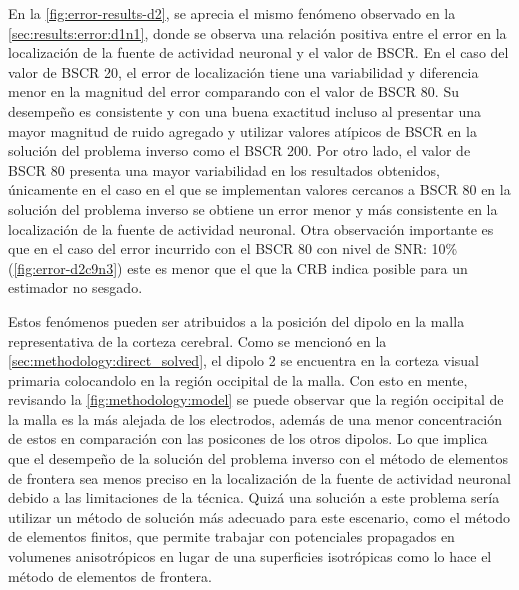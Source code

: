 En la \cref{fig:error-results-d2}, se aprecia el mismo fenómeno observado en la \cref{sec:results:error:d1n1}, donde se observa una relación positiva entre el error en la localización de la fuente de actividad neuronal y el valor de BSCR.
En el caso del valor de BSCR 20, el error de localización tiene una variabilidad y diferencia menor en la magnitud del error comparando con el valor de BSCR 80.
Su desempeño es consistente y con una buena exactitud incluso al presentar una mayor magnitud de ruido agregado y utilizar valores atípicos de BSCR en la solución del problema inverso como el BSCR 200.
Por otro lado, el valor de BSCR 80 presenta una mayor variabilidad en los resultados obtenidos, únicamente en el caso en el que se implementan valores cercanos a BSCR 80 en la solución del problema inverso se obtiene un error menor y más consistente en la localización de la fuente de actividad neuronal.
Otra observación importante es que en el caso del error incurrido con el BSCR 80 con nivel de SNR: 10\% (\cref{fig:error-d2c9n3}) este es menor que el que la CRB indica posible para un estimador no sesgado.

Estos fenómenos pueden ser atribuidos a la posición del dipolo en la malla representativa de la corteza cerebral. 
Como se mencionó en la \cref{sec:methodology:direct_solved}, el dipolo 2 se encuentra en la corteza visual primaria colocandolo en la región occipital de la malla.
Con esto en mente, revisando la \cref{fig:methodology:model} se puede observar que la región occipital de la malla es la más alejada de los electrodos, además de una menor concentración de estos en comparación con las posicones de los otros dipolos. 
Lo que implica que el desempeño de la solución del problema inverso con el método de elementos de frontera sea menos preciso en la localización de la fuente de actividad neuronal debido a las limitaciones de la técnica.
Quizá una solución a este problema sería utilizar un método de solución más adecuado para este escenario, como el método de elementos finitos, que permite trabajar con potenciales propagados en volumenes anisotrópicos en lugar de una superficies isotrópicas como lo hace el método de elementos de frontera.


